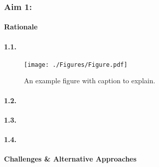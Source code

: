 \newcommand{\FigInc}{%
\begin{wrapfigure}{R}{3.05in}
  \begin{mdframed}
  \texttt{[image: ./Figures/Figure.pdf]}
  \caption{An example figure with caption to explain.}
  \label{incFigure}
  \end{mdframed}
\end{wrapfigure}}

\subsubsection{Aim 1: \SpecificAimOne}

\paragraph{Rationale}

\lipsum[1-1]

\paragraph{1.1. \SpecificAimOneA}

\FigInc
\lipsum[2-2]

\paragraph{1.2. \SpecificAimOneB}

\lipsum[3-3]

\paragraph{1.3. \SpecificAimOneC}

\lipsum[4-4]

\paragraph{1.4. \SpecificAimOneD}

\lipsum[5-5]

\paragraph{Challenges \& Alternative Approaches}

\lipsum[6-6]

